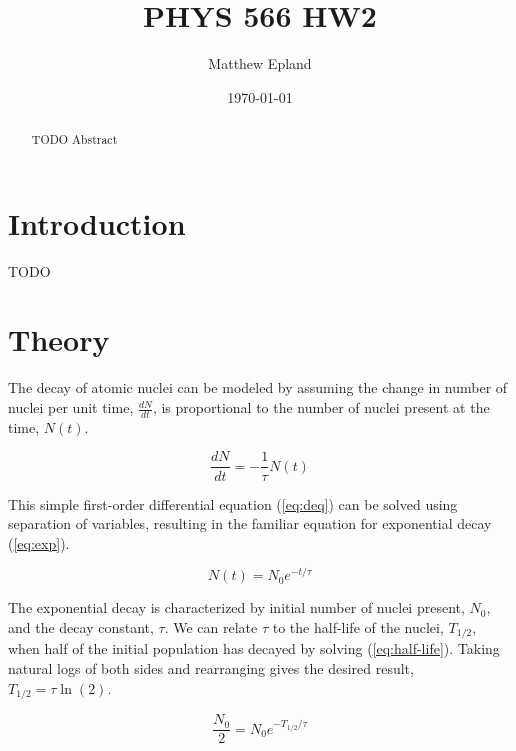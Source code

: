 \documentclass[notitlepage,aps,prd,nofootinbib]{revtex4-1}
\begin{document}
\title{PHYS 566 HW2}
\author{Matthew Epland}

\date{\today}

\begin{abstract}
TODO Abstract
\end{abstract}\maketitle



\section{Introduction}
\label{sec:intro}
TODO


\section{Theory}
\label{sec:theory}

The decay of atomic nuclei can be modeled by assuming the change in number of nuclei per unit time, $\frac{d N}{d t}$, is proportional to the number of nuclei present at the time, $N\left(t\right)$.

\begin{equation} \label{eq:deq}
\frac{d N}{d t} = -\frac{1}{\tau} N\left(t\right)
\end{equation}

This simple first-order differential equation (\ref{eq:deq}) can be solved using separation of variables, resulting in the familiar equation for exponential decay (\ref{eq:exp}).

\begin{equation} \label{eq:exp}
N\left(t\right) = N_{0} e^{-t/\tau}
\end{equation}

The exponential decay is characterized by initial number of nuclei present, $N_{0}$, and the decay constant, $\tau$. We can relate $\tau$ to the half-life of the nuclei, $T_{1/2}$, when half of the initial population has decayed by solving (\ref{eq:half-life}). Taking natural logs of both sides and rearranging gives the desired result, $T_{1/2} = \tau \ln\left(2\right)$.


\begin{equation} \label{eq:half-life}
\frac{N_{0}}{2} = N_{0} e^{-T_{1/2}/\tau}
\end{equation}
\end{document}
